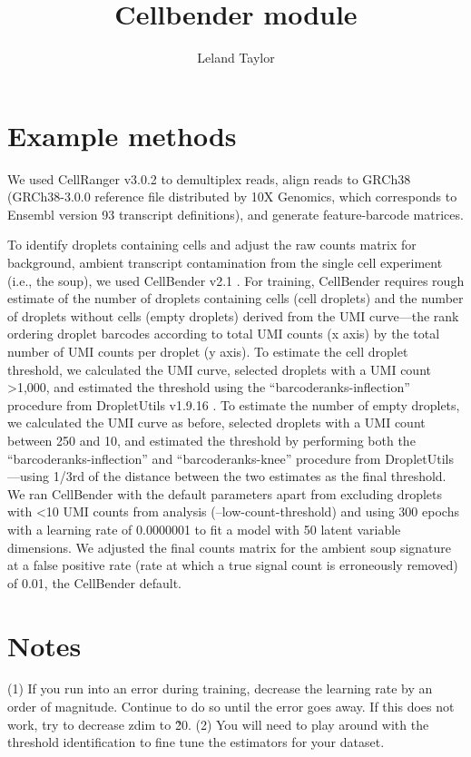 \documentclass{article}
\begin{document}
\title{Cellbender module}
\author{Leland Taylor}

\maketitle

\section{Example methods}

We used CellRanger v3.0.2 to demultiplex reads, align reads to GRCh38 (GRCh38-3.0.0 reference file distributed by 10X Genomics, which corresponds to Ensembl version 93 transcript definitions), and generate feature-barcode matrices. 

To identify droplets containing cells and adjust the raw counts matrix for background, ambient transcript contamination from the single cell experiment (i.e., the soup), we used CellBender v2.1 \citep{fleming_cellbender_2019}. For training, CellBender requires rough estimate of the number of droplets containing cells (cell droplets) and the number of droplets without cells (empty droplets) derived from the UMI curve—the rank ordering droplet barcodes according to total UMI counts (x axis) by the total number of UMI counts per droplet (y axis). To estimate the cell droplet threshold, we calculated the UMI curve, selected droplets with a UMI count >1,000, and estimated the threshold using the “barcoderanks-inflection” procedure from DropletUtils v1.9.16 \citep{lun_emptydrops_2019}. To estimate the number of empty droplets, we calculated the UMI curve as before, selected droplets with a UMI count between 250 and 10, and estimated the threshold by performing both the  “barcoderanks-inflection” and “barcoderanks-knee” procedure from DropletUtils—using 1/3rd of the distance between the two estimates as the final threshold. We ran CellBender with the default parameters apart from excluding droplets with <10 UMI counts from analysis (--low-count-threshold) and using 300 epochs with a learning rate of 0.0000001 to fit a model with 50 latent variable dimensions. We adjusted the final counts matrix for the ambient soup signature at a false positive rate (rate at which a true signal count is erroneously removed) of 0.01, the CellBender default.  

\section{Notes}

(1) If you run into an error during training, decrease the learning rate by an order of magnitude. Continue to do so until the error goes away. If this does not work, try to decrease zdim to \~20. 
(2) You will need to play around with the threshold identification to fine tune the estimators for your dataset. 



\end{document}
